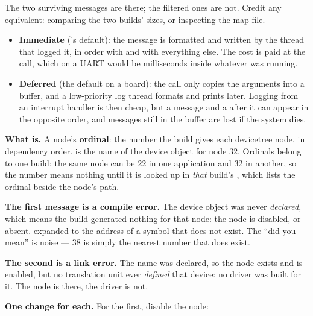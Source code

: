 \noindent The two surviving messages are there; the filtered ones are not. Credit any equivalent:
comparing the two builds' sizes, or inspecting the map file. 

\begin{itemize}
  \item \textbf{Immediate} ('s default): the message is formatted and written by
    the thread that logged it, in order with  and with everything else. The cost is
    paid at the call, which on a UART would be milliseconds inside whatever was running.
  \item \textbf{Deferred} (the default on a board): the call only copies the arguments into a
    buffer, and a low-priority log thread formats and prints later. Logging from an interrupt
    handler is then cheap, but a message and a  after it can appear in the opposite
    order, and messages still in the buffer are lost if the system dies.
\end{itemize}


\textbf{What  is.} A node's \textbf{ordinal}: the number the build gives each devicetree
node, in dependency order.  is the name of the device object for node 32.
Ordinals belong to one build: the same node can be 22 in one application and 32 in another, so the
number means nothing until it is looked up in \emph{that} build's
, which lists the ordinal beside
the node's path. 

\textbf{The first message is a compile error.} The device object was never \emph{declared}, which
means the build generated nothing for that node: the node is disabled, or absent.
 expanded to the address of a symbol that does not exist. The ``did you mean''
is noise --- 38 is simply the nearest number that does exist. 

\textbf{The second is a link error.} The name was declared, so the node exists and is enabled, but
no translation unit ever \emph{defined} that device: no driver was built for it. The node is there,
the driver is not. 

\textbf{One change for each.} For the first, disable the node:


